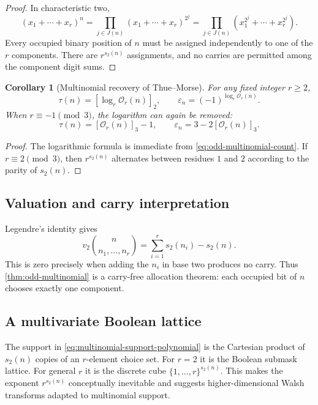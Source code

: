 \documentclass[11pt,oneside]{article}
\newtheorem{corollary}[theorem]{Corollary}
\theoremstyle{definition}
\theoremstyle{remark}
\newcommand{\vtwo}{v_2}
\newcommand{\bitsum}{s_2}
\newcommand{\eps}{\varepsilon}
\begin{document}
\begin{proof}
In characteristic two,
\[
 (x_1+\cdots+x_r)^n
 =\prod_{j\in J(n)}(x_1+\cdots+x_r)^{2^j}
 =\prod_{j\in J(n)}(x_1^{2^j}+\cdots+x_r^{2^j}).
\]
Every occupied binary position of $n$ must be assigned independently to one of
the $r$ components.  There are $r^{\bitsum(n)}$ assignments, and no carries
are permitted among the component digit sums.
\end{proof}

\begin{corollary}[Multinomial recovery of Thue--Morse]\label{cor:multinomial-recovery}
For any fixed integer $r\ge2$,
\begin{equation}\label{eq:multinomial-log-recovery}
 \tau(n)=\left[\log_r\mathcal O_r(n)\right]_2,
 \qquad
 \eps_n=(-1)^{\log_r\mathcal O_r(n)}.
\end{equation}
When $r\equiv-1\pmod3$, the logarithm can again be removed:
\begin{equation}\label{eq:multinomial-logfree}
 \tau(n)=[\mathcal O_r(n)]_3-1,
 \qquad
 \eps_n=3-2[\mathcal O_r(n)]_3.
\end{equation}
\end{corollary}

\begin{proof}
The logarithmic formula is immediate from \cref{eq:odd-multinomial-count}.  If
$r\equiv2\pmod3$, then $r^{\bitsum(n)}$ alternates between residues $1$ and
$2$ according to the parity of $\bitsum(n)$.
\end{proof}

\subsection{Valuation and carry interpretation}

Legendre's identity gives
\begin{equation}\label{eq:multinomial-v2}
 \vtwo\binom{n}{n_1,\ldots,n_r}
 =\sum_{i=1}^r\bitsum(n_i)-\bitsum(n).
\end{equation}
This is zero precisely when adding the $n_i$ in base two produces no carry.
Thus \cref{thm:odd-multinomial} is a carry-free allocation theorem: each
occupied bit of $n$ chooses exactly one component.

\subsection{A multivariate Boolean lattice}

The support in \cref{eq:multinomial-support-polynomial} is the Cartesian
product of $\bitsum(n)$ copies of an $r$-element choice set.  For $r=2$ it is
the Boolean submask lattice.  For general $r$ it is the discrete cube
$\{1,\ldots,r\}^{\bitsum(n)}$.  This makes the exponent
$r^{\bitsum(n)}$ conceptually inevitable and suggests higher-dimensional
Walsh transforms adapted to multinomial support.
\end{document}
